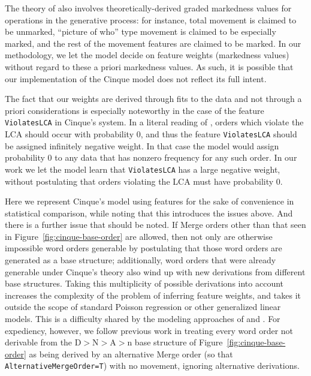 \documentclass[11pt]{article}
\newcommand{\alternativeMergeOrder}{\texttt{AlternativeMergeOrder}\xspace}
\begin{document}
The theory of \citet{cinque2005deriving} also involves theoretically-derived graded markedness values for operations in the generative process: for instance, total movement is claimed to be unmarked, ``picture of who'' type movement is claimed to be especially marked, and the rest of the movement features are claimed to be marked.
In our methodology, we let the model decide on feature weights (markedness values) without regard to these a priori markedness values.
As such, it is possible that our implementation of the Cinque model
does not reflect its full intent. 

The fact that our weights are derived through fits to the data and not through a priori considerations is especially noteworthy in the case of the feature \texttt{ViolatesLCA} in Cinque's system.
In a literal reading of \citet{cinque2005deriving}, orders which violate the LCA should occur with probability 0, and thus the feature \texttt{ViolatesLCA} should be assigned infinitely negative weight.
In that case the model would assign probability 0 to any data that has nonzero frequency for any such order.
In our work we let the model learn that \texttt{ViolatesLCA} has a large negative weight, without postulating that orders violating the LCA must have probability 0.

Here we represent Cinque's model using features for the sake of
convenience in statistical comparison, while noting that this
introduces the issues above.  And there is a further issue that should
be noted.  If Merge orders other than that seen in
Figure~\ref{fig:cinque-base-order} are allowed, then not only are
otherwise impossible word orders generable by postulating that those
word orders are generated as a base structure; additionally, word
orders that were already generable under Cinque's theory also wind up
with new derivations from different base structures.  Taking this
multiplicity of possible derivations into account increases the
complexity of the problem of inferring feature weights, and takes it
outside the scope of standard Poisson regression or other generalized
linear models.  This is a difficulty shared by the modeling approaches
of \citet{cysouw2010towards} and \citet{merlo2015predicting}.  For
expediency, however, we follow previous work in treating every word
order not derivable from the D$>$N$>$A$>$n base structure of
Figure~\ref{fig:cinque-base-order} as being derived by an alternative
Merge order (so that \alternativeMergeOrder\texttt{=T}) with no
movement, ignoring alternative derivations.
\end{document}
